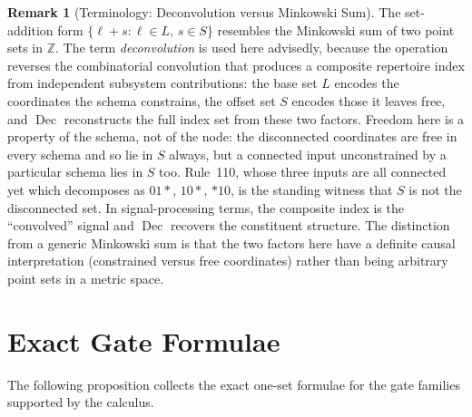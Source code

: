 \documentclass[11pt]{article}
\theoremstyle{definition}
\newtheorem{remark}{Remark}
\begin{document}
\begin{remark}[Terminology: Deconvolution versus Minkowski Sum]
The set-addition form \(\{\ell+s:\ell\in L,\,s\in S\}\) resembles the Minkowski sum of two
point sets in \(\mathbb{Z}\). The term \emph{deconvolution} is used here advisedly, because the
operation reverses the combinatorial convolution that produces a composite repertoire index from
independent subsystem contributions: the base set \(L\) encodes the coordinates the schema constrains,
the offset set \(S\) encodes those it leaves free, and
\(\operatorname{Dec}\) reconstructs the full index set from these two factors.
Freedom here is a property of the schema, not of the node: the disconnected
coordinates are free in every schema and so lie in \(S\) always, but a connected
input unconstrained by a particular schema lies in \(S\) too.  Rule~110, whose
three inputs are all connected yet which decomposes as \(01\ast\), \(10\ast\),
\(\ast10\), is the standing witness that \(S\) is not the disconnected set. In signal-processing
terms, the composite index is the ``convolved'' signal and \(\operatorname{Dec}\) recovers the
constituent structure. The distinction from a generic Minkowski sum is that the two factors here
have a definite causal interpretation (constrained versus free coordinates) rather than being
arbitrary point sets in a metric space.
\end{remark}

\section{Exact Gate Formulae}
The following proposition collects the exact one-set formulae for the gate families supported by the calculus.
\end{document}
